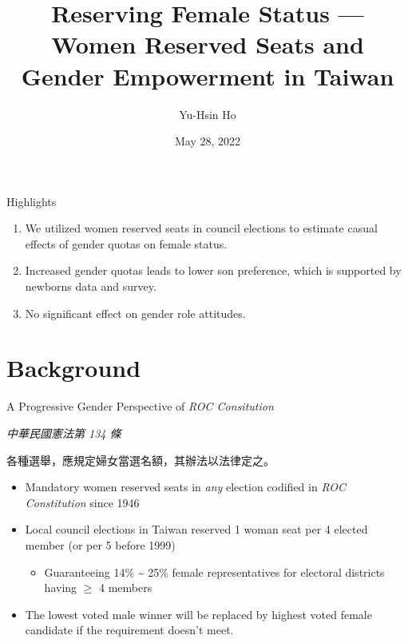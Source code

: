 \documentclass[
  10pt,
  ignorenonframetext,
  aspectratio=43,
]{beamer}
\title{Reserving Female Status --- Women Reserved Seats and Gender
Empowerment in Taiwan}
\author{Yu-Hsin Ho}
\date{May 28, 2022}
\institute{Department of Economics, National Taiwan University}
\providecommand{\tightlist}{%
  \setlength{\itemsep}{0pt}\setlength{\parskip}{0pt}}
\renewenvironment{quote}{\begin{customblockquote}\list{}{\rightmargin=0em\leftmargin=0em}%
\item\relax\color{blockquote-text}\ignorespaces}{\unskip\unskip\endlist\end{customblockquote}}
\begin{document}
\frame{\titlepage}

\begin{frame}
  \tableofcontents[hideallsubsections]
\end{frame}
\begin{frame}{Highlights}
\protect\hypertarget{highlights}{}
\begin{enumerate}
\tightlist
\item
  We utilized women reserved seats in council elections to estimate
  casual effects of gender quotas on female status.
\item
  Increased gender quotas leads to lower son preference, which is
  supported by newborns data and survey.
\item
  No significant effect on gender role attitudes.
\end{enumerate}
\end{frame}

\hypertarget{background}{%
\section{Background}\label{background}}

\begin{frame}{A Progressive Gender Perspective of \emph{ROC
Consitution}}
\protect\hypertarget{a-progressive-gender-perspective-of-roc-consitution}{}
\begin{quote}
\emph{中華民國憲法第 134 條}

各種選舉，應規定婦女當選名額，其辦法以法律定之。
\end{quote}

\begin{itemize}
\tightlist
\item
  Mandatory women reserved seats in \emph{any} election codified in
  \emph{ROC Constitution} since 1946
\item
  Local council elections in Taiwan reserved 1 woman seat per 4 elected
  member (or per 5 before 1999)

  \begin{itemize}
  \tightlist
  \item
    Guaranteeing 14\% \textasciitilde{} 25\% female representatives for
    electoral districts having \(\geq\) 4 members
  \end{itemize}
\item
  The lowest voted male winner will be replaced by highest voted female
  candidate if the requirement doesn't meet.
\end{itemize}
\end{frame}
\end{document}
